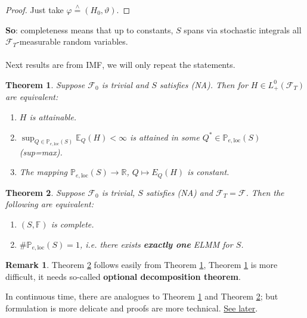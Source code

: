 \documentclass[12pt,a4paper, twoside]{article}
\newtheorem{thm}{Theorem}[section]
\theoremstyle{definition}
\newtheorem{rem}{Remark}[section]
\newcommand{\EE}{\mathbb{E}} %
\newcommand{\PP}{\mathbb{P}} %
\newcommand{\teq}{\overset{\wedge}{=}}
\begin{document}
\begin{proof}
Just take $\varphi \teq (H_0, \vartheta)$. 
\end{proof}
\textbf{So}: completeness means that up to constants, $S$ spans via stochastic integrals all $\mathcal{F}_T$-measurable random variables. 
\\\\
Next results are from IMF, we will only repeat the statements.
\newpage
\begin{thm} \label{T62} Suppose $\mathcal{F}_0$ is trivial and $S$ satisfies (NA). Then for $H \in L_+^0( \mathcal{F}_T)$ are equivalent: 
\begin{enumerate}
\item $H$ is attainable.
\item $\sup_{Q \in \PP_{e, \text{loc}}(S)} \EE_Q(H) < \infty$ is attained in some $Q^* \in \PP_{e, \text{loc}}(S)$ (sup=max). 
\item The mapping $\PP_{e, \text{loc}}(S) \to \mathbb{R}$, $Q \mapsto E_Q(H)$ is constant.
\end{enumerate}
\end{thm}
\begin{thm} \label{T63} Suppose $\mathcal{F}_0$ is trivial, $S$ satisfies (NA) and $\mathcal{F}_T= \mathcal{F}$. Then the following are equivalent:
\begin{enumerate}
\item $(S, \mathbb{F})$ is complete.
\item $\# \mathbb{P}_{e, \text{loc}}(S)=1$, i.e. there exists \textbf{exactly one} ELMM for $S$. 
\end{enumerate}
\end{thm}
\begin{rem} Theorem \ref{T63} follows easily from Theorem \ref{T62}, Theorem \ref{T62} is more difficult, it needs so-called \textbf{optional decomposition theorem}.
\end{rem}
In continuous time, there are analogues to Theorem \ref{T62} and Theorem \ref{T63}; but formulation is more delicate and proofs are more technical. \underline{See later}. 
\end{document}
